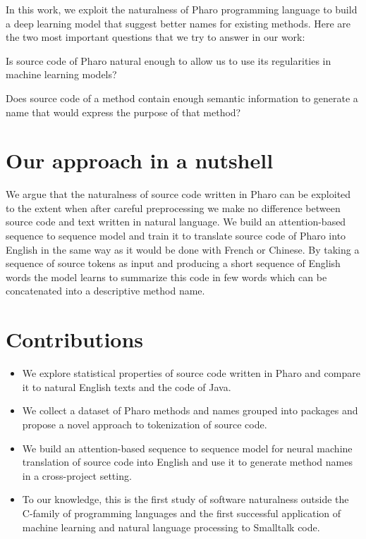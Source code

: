 In this work, we exploit the naturalness of Pharo programming language to build a deep learning model that suggest better names for existing methods. Here are the two most important questions that we try to answer in our work:

\begin{RQ}
	\item Is source code of Pharo natural enough to allow us to use its regularities in machine learning models?
	\item Does source code of a method contain enough semantic information to generate a name that would express the purpose of that method?
\end{RQ}

\section{Our approach in a nutshell}

We argue that the naturalness of source code written in Pharo can be exploited to the extent when after careful preprocessing we make no difference between source code and text written in natural language. We build an attention-based sequence to sequence model and train it to translate source code of Pharo into English in the same way as it would be done with French or Chinese. By taking a sequence of source tokens as input and producing a short sequence of English words the model learns to summarize this code in few words which can be concatenated into a descriptive method name.

\section{Contributions}

\begin{itemize}
	\item We explore statistical properties of source code written in Pharo and compare it to natural English texts and the code of Java.
	\item We collect a dataset of Pharo methods and names grouped into packages and propose a novel approach to tokenization of source code.
	\item We build an attention-based sequence to sequence model for neural machine translation of source code into English and use it to generate method names in a cross-project setting.
	\item To our knowledge, this is the first study of software naturalness outside the C-family of programming languages and the first successful application of machine learning and natural language processing to Smalltalk code.
\end{itemize}

